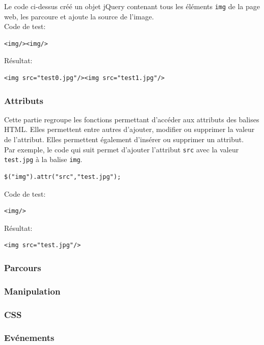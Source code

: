 \documentclass[10pt,a4paper,titlepage]{article}
\begin{document}
Le code ci-dessus créé un objet jQuery contenant tous les éléments \texttt{img} de la page web, les parcoure et ajoute la source de l'image.\\

Code de test:
\begin{lstlisting}
<img/><img/>
\end{lstlisting}


Résultat:
\begin{lstlisting}
<img src="test0.jpg"/><img src="test1.jpg"/>
\end{lstlisting}

\subsubsection{Attributs}
Cette partie regroupe les fonctions permettant d'accéder aux attributs des balises HTML. Elles permettent entre autres d'ajouter, modifier ou supprimer la valeur de l'attribut. Elles permettent également d'insérer ou supprimer un attribut.\\

Par exemple, le code qui suit permet d'ajouter l'attribut \texttt{src} avec la valeur \texttt{test.jpg} à la balise \texttt{img}.

\begin{lstlisting}
$("img").attr("src","test.jpg");
\end{lstlisting}


Code de test:
\begin{lstlisting}
<img/>
\end{lstlisting}


Résultat:
\begin{lstlisting}
<img src="test.jpg"/>
\end{lstlisting}

\subsubsection{Parcours}


\subsubsection{Manipulation}
\subsubsection{CSS}
\subsubsection{Evénements}
\end{document}

